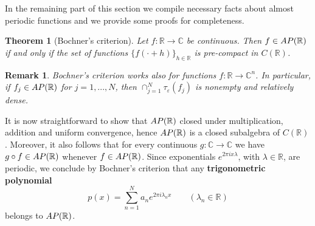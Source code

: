 \documentclass[a4paper,reqno,12pt]{amsart}
\newtheorem{theorem}{Theorem}
\newtheorem{remark}{Remark}
\renewcommand{\r}{\mathbb{R}}
\newcommand{\cp}{\mathbb{C}} %
\newcommand{\la}{\lambda}
\newcommand{\ep}{\varepsilon}
\newcommand{\1}{{\bf 1}}
\renewcommand{\emph}[1]{{\bf #1}}
\newcommand{\apr}{{\rm AP}(\r)}
\renewcommand{\1}{{\bo 1}}
\begin{document}
In the remaining part of this section we compile necessary facts about almost periodic functions and we provide some proofs for completeness.

\begin{theorem}[Bochner's criterion]
Let $f:\r\to\cp$ be continuous. Then $f\in \apr$ if and only if the set of functions $\{f(\cdot +h)\}_{h\in \r}$ is pre-compact in $C(\r)$.
\end{theorem}

\begin{remark}
Bochner's criterion works also for functions $f:\r\to \cp^n$. In particular, if $f_j\in \apr$ for $j=1,...,N$, then $\cap_{j=1}^N \tau_\ep(f_j)$ is nonempty and relatively dense.
\end{remark}

It is now straightforward to show that $\apr$ closed under multiplication, addition and uniform convergence, hence $\apr$ is a closed subalgebra of $C(\r)$. Moreover, it also follows that for every continuous $g:\cp\to\cp$ we have $g\circ f \in \apr$ whenever $f\in \apr$. Since exponentials $e^{2\pi i x \la}$, with $\la \in \r$, are periodic, we conclude by Bochner's criterion that any \emph{trigonometric polynomial }
$$
p(x)=\sum_{n=1}^N a_n e^{2\pi i \la_n x} \quad \quad (\la_n\in \r)
$$
belongs to $\apr$. 
\end{document}
